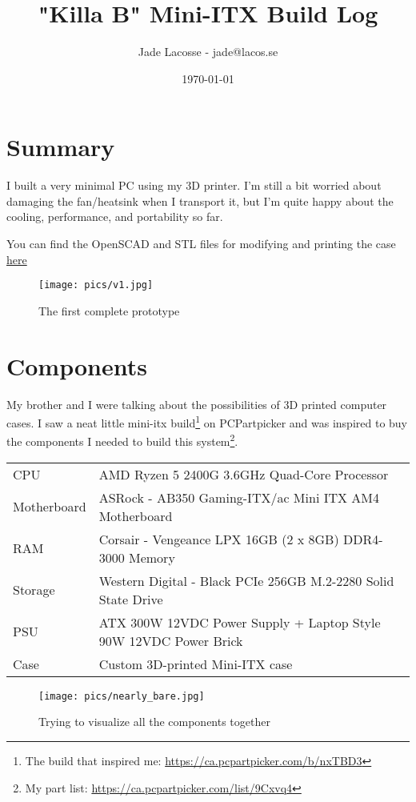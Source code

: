\documentclass{article}
\title{\textbf{"Killa B" Mini-ITX Build Log}}
\author{Jade Lacosse - jade@lacos.se}
\date{\today}
\begin{document}
\maketitle
\tableofcontents

\section{Summary}
I built a very minimal PC using my 3D printer. I'm still a bit worried about damaging the fan/heatsink when I transport it, but I'm quite happy about the cooling, performance, and portability so far.

You can find the OpenSCAD and STL files for modifying and printing the case \href{https://thingiverse.com/thing:2966093}{here}

\begin{figure}[h]
\texttt{[image: pics/v1.jpg]}
\caption{The first complete prototype}
\end{figure}

\section{Components}
My brother and I were talking about the possibilities of 3D printed computer cases. I saw a neat little mini-itx build\footnote{The build that inspired me: \url{https://ca.pcpartpicker.com/b/nxTBD3}} on PCPartpicker and was inspired to buy the components I needed to build this system\footnote{My part list: \url{https://ca.pcpartpicker.com/list/9Cxvq4}}.
\begin{center}
\begin{tabular}{ l l }
 CPU & AMD Ryzen 5 2400G 3.6GHz Quad-Core Processor \\  
 Motherboard & ASRock - AB350 Gaming-ITX/ac Mini ITX AM4 Motherboard \\  
 RAM & Corsair - Vengeance LPX 16GB (2 x 8GB) DDR4-3000 Memory \\
 Storage & Western Digital - Black PCIe 256GB M.2-2280 Solid State Drive \\
 PSU & ATX 300W 12VDC Power Supply + Laptop Style 90W 12VDC Power Brick \\
 Case & Custom 3D-printed  Mini-ITX case \\
\end{tabular}
\end{center}

\begin{figure}[h]
\texttt{[image: pics/nearly\_bare.jpg]}
\caption{Trying to visualize all the components together}
\end{figure}
\end{document}
